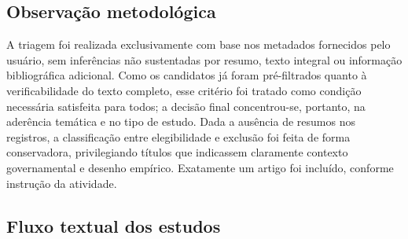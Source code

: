 \documentclass[12pt,a4paper]{article}
\begin{document}
\subsection{Observação metodológica}
\label{sec:org6941c0c}

A triagem foi realizada exclusivamente com base nos metadados fornecidos pelo usuário, sem inferências não sustentadas por resumo, texto integral ou informação bibliográfica adicional. Como os candidatos já foram pré-filtrados quanto à verificabilidade do texto completo, esse critério foi tratado como condição necessária satisfeita para todos; a decisão final concentrou-se, portanto, na aderência temática e no tipo de estudo. Dada a ausência de resumos nos registros, a classificação entre elegibilidade e exclusão foi feita de forma conservadora, privilegiando títulos que indicassem claramente contexto governamental e desenho empírico. Exatamente um artigo foi incluído, conforme instrução da atividade.

\subsection{Fluxo textual dos estudos}
\label{sec:orgc004bc1}
\end{document}
